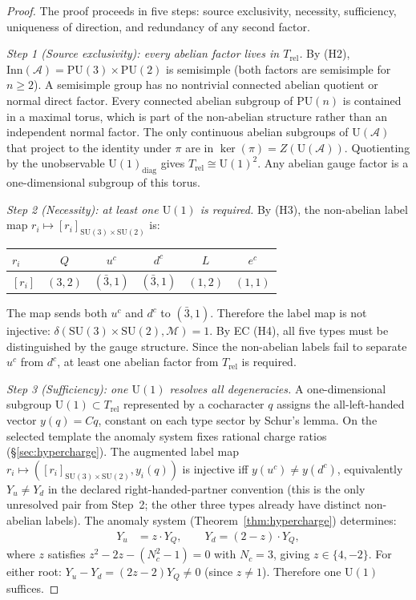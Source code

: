 \documentclass[11pt]{article}
\theoremstyle{definition}
\newcommand{\SU}{\mathrm{SU}}
\newcommand{\U}{\mathrm{U}}
\begin{document}
\begin{proof}
The proof proceeds in five steps: source exclusivity, necessity,
sufficiency, uniqueness of direction, and redundancy of any second
factor.

\textit{Step 1 (Source exclusivity): every abelian factor lives in
$T_{\mathrm{rel}}$.}\quad
By (H2), $\mathrm{Inn}(\mathcal{A}) = \mathrm{PU}(3) \times
\mathrm{PU}(2)$ is semisimple (both factors are semisimple for
$n \ge 2$).  A semisimple group has no nontrivial connected abelian quotient or
normal direct factor.  Every connected abelian subgroup of
$\mathrm{PU}(n)$ is contained in a maximal torus, which is part of the
non-abelian structure rather than an independent normal factor.
The only continuous abelian subgroups of $\mathrm{U}(\mathcal{A})$
that project to the identity under $\pi$ are in $\ker(\pi) =
Z(\mathrm{U}(\mathcal{A}))$.  Quotienting by the unobservable
$\mathrm{U}(1)_{\mathrm{diag}}$ gives $T_{\mathrm{rel}} \cong
\mathrm{U}(1)^2$.  Any abelian gauge factor is a one-dimensional
subgroup of this torus.

\textit{Step 2 (Necessity): at least one $\U(1)$ is required.}\quad
By (H3), the non-abelian label map
$r_i \mapsto [r_i]_{\SU(3) \times \SU(2)}$ is:
\begin{center}\small
\begin{tabular}{@{}lccccc@{}}
\toprule
$r_i$ & $Q$ & $u^c$ & $d^c$ & $L$ & $e^c$ \\
\midrule
$[r_i]$ & $(3,2)$ & $(\bar{3},1)$ & $(\bar{3},1)$ & $(1,2)$ & $(1,1)$ \\
\bottomrule
\end{tabular}
\end{center}
The map sends both $u^c$ and $d^c$ to $(\bar{3}, 1)$.  Therefore
the label map is not injective: $\delta(\SU(3) \times \SU(2),
\mathcal{M}) = 1$.  By EC (H4), all five types must be
distinguished by the gauge structure.  Since the non-abelian
labels fail to separate $u^c$ from $d^c$, at least one abelian
factor from $T_{\mathrm{rel}}$ is required.

\textit{Step 3 (Sufficiency): one $\U(1)$ resolves all
degeneracies.}\quad
A one-dimensional subgroup $\U(1) \subset T_{\mathrm{rel}}$
represented by a cocharacter $q$ assigns the all-left-handed vector
$y(q)=Cq$, constant on each type sector by Schur's lemma.  On the
selected template the anomaly system fixes rational charge ratios
(\S\ref{sec:hypercharge}).  The augmented label map
$r_i\mapsto([r_i]_{\SU(3)\times\SU(2)},y_i(q))$ is injective iff
$y(u^c)\ne y(d^c)$, equivalently $Y_u\ne Y_d$ in the declared
right-handed-partner convention (this is the only unresolved pair
from Step~2; the other three types already have distinct
non-abelian labels).  The anomaly system
(Theorem~\ref{thm:hypercharge}) determines:
\begin{align*}
  Y_u &= z \cdot Y_Q, \qquad Y_d = (2 - z) \cdot Y_Q,
\end{align*}
where $z$ satisfies $z^2 - 2z - (N_c^2 - 1) = 0$ with $N_c = 3$,
giving $z \in \{4, -2\}$.  For either root:
$Y_u - Y_d = (2z - 2) Y_Q \ne 0$ (since $z \ne 1$).
Therefore one $\U(1)$ suffices.


\end{proof}
\end{document}
